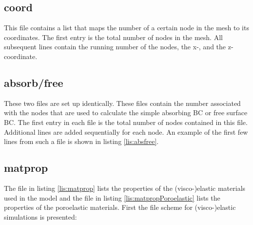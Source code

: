     	\subsection{coord}
    	\label{subsec:coord}
    	
    		This file contains a list that maps the number of a certain node in the mesh to its coordinates. The first entry is the total number of nodes in the mesh. All subsequent lines contain the running number of the nodes, the x-, and the z-coordinate.

		\medskip
    	\subsection{absorb/free}
    	\label{subsec:absfree}
    		 
    		These two files are set up identically. These files contain the number associated with the nodes that are used to calculate the simple absorbing BC or free surface BC. The first entry in each file is the total number of nodes contained in this file. Additional lines are added sequentially for each node. An example of the first few lines from such a file is shown in listing \ref{lis:absfree}.
    	\subsection{matprop}
    	\label{subsec:matprop}
    		
    		The file in listing \ref{lis:matprop} lists the properties of the (visco-)elastic materials used in the model and the file in listing \ref{lis:matpropPoroelastic} lists the properties of the poroelastic materials. First the file scheme for (visco-)elastic simulations is presented:
    		
